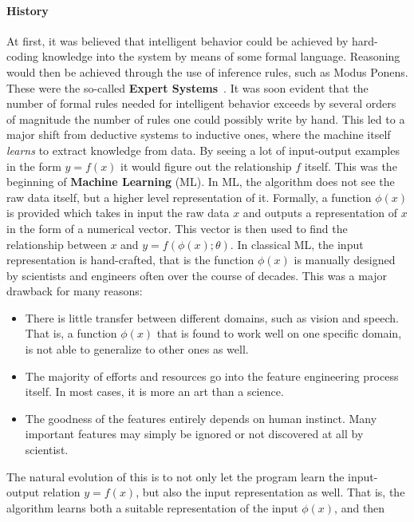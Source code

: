 \documentclass[../main.tex]{subfiles}
\begin{document}
    \paragraph{History}
    At first, it was believed that intelligent behavior could be achieved by hard-coding knowledge into the system by means
    of some formal language. Reasoning would then be achieved through the use of inference rules, such as Modus Ponens.
    These were the so-called \textbf{Expert Systems}~\cite{Jackson_1986}.
    It was soon evident that the number of formal rules needed for intelligent behavior exceeds by several orders of magnitude
    the number of rules one could possibly write by hand.
    \newline
    This led to a major shift from deductive systems to inductive ones, where the machine itself \textit{learns} to extract
    knowledge from data. By seeing a lot of input-output examples in the form $y = f(x)$ it would figure out the relationship $f$ itself.
    This was the beginning of \textbf{Machine Learning} (ML). In ML, the algorithm does not see the raw data itself, but a higher level
    representation of it. Formally, a function $\phi(x)$ is provided which takes in input the raw data $x$ and outputs a representation of $x$ in the
    form of a numerical vector. This vector is then used to find the relationship between $x$ and $y = f(\phi(x); \theta)$.
    In classical ML, the input representation is hand-crafted, that is the function $\phi(x)$ is manually designed by scientists
    and engineers often over the course of decades. This was a major drawback for many reasons:
    \begin{itemize}
        \item There is little transfer between different domains, such as vision and speech. That is, a function $\phi(x)$ that is found
            to work well on one specific domain, is not able to generalize to other ones as well.
        \item The majority of efforts and resources go into the feature engineering process itself. In most cases, it is more an art
            than a science.
        \item The goodness of the features entirely depends on human instinct. Many important features may simply be ignored or not
            discovered at all by scientist.
    \end{itemize}
    The natural evolution of this is to not only let the program learn the input-output relation $y = f(x)$,
    but also the input representation as well. That is, the algorithm learns both a suitable representation of the input $\phi(x)$, and then
\end{document}
